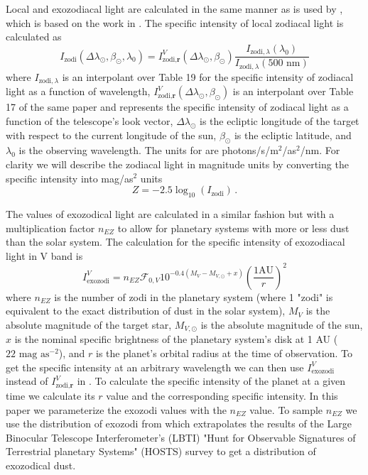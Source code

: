 Local and exozodiacal light are calculated in the same manner as is used by
, which is based on the work in \citet{leinert1997Reference1998,
starkMaximizingExoEarthCandidate2014,starkLowerLimitsAperture2015,
keithlyOptimalScheduling2020}. The specific intensity of local zodiacal
light is calculated as
\begin{equation}
  I_\textrm{zodi}(\Delta \lambda_\odot, \beta_\odot, \lambda_0) = 
  I_{\textrm{zodi}, \textbf{r}}^V(\Delta \lambda_\odot, \beta_\odot) 
\frac{I_{\textrm{zodi}, \lambda} (\lambda_0)}{I_{\textrm{zodi}, \lambda}(\textrm{500 nm})}
  \label{eq:local_zodi}
\end{equation}
where $I_{\textrm{zodi}, \lambda}$ is an interpolant over
\citet{leinert1997Reference1998} Table 19 for the specific intensity of
zodiacal light as a function of wavelength, $I_{\textrm{zodi},
\textbf{r}}^V(\Delta \lambda_\odot, \beta_\odot)$ is an interpolant over Table 17 of the same
paper and represents the specific intensity of zodiacal light as a function of
the telescope's look vector, $\Delta \lambda_\odot$ is the ecliptic
longitude of the target with respect to the current longitude of the sun,
$\beta_\odot$ is the ecliptic latitude, and $\lambda_0$ is the observing
wavelength. The units for  are photons/s/m$^2$/as$^2$/nm.
For clarity we will describe the zodiacal light in magnitude units by
converting the specific intensity into mag/as$^2$ units
\begin{equation}
  Z = -2.5 \log_{10}(I_\textrm{zodi}) \,.
  \label{eq:zodi_mag}
\end{equation}

The values of exozodical light are calculated in a
similar fashion but with a multiplication factor $n_{EZ}$ to allow for
planetary systems with more or less dust than the solar system. The calculation
for the specific intensity of exozodiacal light in V band is
\begin{equation}
  I_\textrm{exozodi}^V = n_{EZ} \mathcal{F}_{0,V}10^{-0.4(M_V-M_{V,\odot}+x)}\left( \frac{1 \textrm{AU}}{r}\right)^2
  \label{eq:exozodi}
\end{equation}
where $n_{EZ}$ is the number of zodi in the planetary system (where 1 "zodi" is
equivalent to the exact distribution of dust in the solar system), $M_V$ is the
absolute magnitude of the target star, $M_{V,\odot}$ is the absolute magnitude
of the sun, $x$ is the nominal specific brightness of the planetary system's
disk at 1 AU ($22\textrm{ mag }\textrm{as}^{-2}$), and $r$ is the planet's orbital radius at the time of
observation. To get the specific intensity at an arbitrary wavelength we can
then use $I_\textrm{exozodi}^V$ instead of $I_{\textrm{zodi}, \textbf{r}}^V$ in
. To calculate the specific intensity of the planet at a
given time we calculate its $r$ value and the corresponding specific intensity.
In this paper we parameterize the exozodi values with the $n_{EZ}$ value. To
sample $n_{EZ}$ we use the distribution of exozodi from
\citet{ertelHOSTSSurvey2020} which extrapolates the results of the Large
Binocular Telescope Interferometer's (LBTI) "Hunt for Observable Signatures of
Terrestrial planetary Systems" (HOSTS) survey to get a distribution of
exozodical dust.


